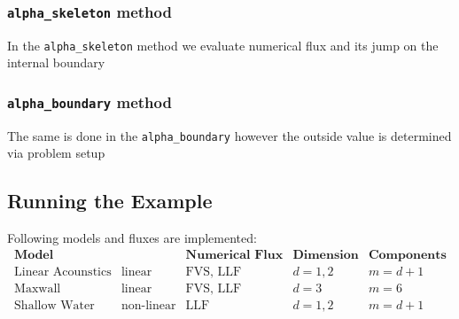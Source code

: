 \documentclass[a4paper,12pt]{article}
\theoremstyle{definition}
\theoremstyle{definition}
\begin{document}
\subsubsection*{\lstinline{alpha_skeleton} method}
In the \lstinline{alpha_skeleton} method we evaluate numerical flux and its jump on the internal boundary



\subsubsection*{\lstinline{alpha_boundary} method}
The same is done in the \lstinline{alpha_boundary} however the outside value is determined via problem setup



\subsection{Running the Example}

Following models and fluxes are implemented:
$$
\begin{array}{c|c|c|c|c}
\textbf{Model} & &\textbf{Numerical Flux}  & \textbf{Dimension} & \textbf{Components} \\  \hline
\text{Linear Acounstics} & \text{linear}& \text{FVS, LLF} & d = 1,2 & m = d + 1  \\
\text{Maxwall       }    & \text{linear} & \text{FVS, LLF} & d = 3 & m = 6 \\
\text{Shallow Water} & \text{non-linear} &\text{LLF} & d = 1,2 & m = d+1
\end{array}
$$





\end{document}
